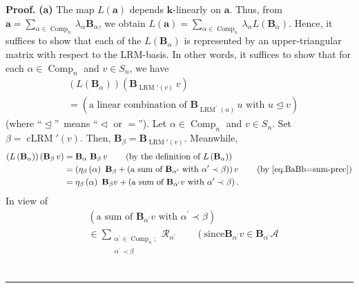 \documentclass[submission]{FPSAC2026}
\newcommand{\Comp}{\operatorname{Comp}}
\newcommand{\cLRM}{\operatorname{cLRM}}
\newcommand{\LRM}{\operatorname{LRM}}
\newenvironment{proof}[1][Proof]{\noindent\textbf{#1.} }{\ \rule{0.5em}{0.5em}}
\begin{document}
\begin{proof}
\textbf{(a)} The map $L\left(  \mathbf{a}\right)  $ depends $\mathbf{k}%
$-linearly on $\mathbf{a}$. Thus, from $\mathbf{a}=\sum_{\alpha\in
\operatorname{Comp}_{n}}\lambda_{\alpha}\mathbf{B}_{\alpha}$, we obtain
$L\left(  \mathbf{a}\right)  =\sum_{\alpha\in\operatorname{Comp}_{n}}%
\lambda_{\alpha}L\left(  \mathbf{B}_{\alpha}\right)  $. Hence, it suffices to
show that each of the $L\left(  \mathbf{B}_{\alpha}\right)  $ is represented
by an upper-triangular matrix with respect to the LRM-basis. In other words,
it suffices to show that for each $\alpha\in\Comp_{n}$
and $v\in S_{n}$, we have%
\begin{align}
& \left(  L\left(  \mathbf{B}_{\alpha}\right)  \right)  \left(  \mathbf{B}%
_{\LRM'(v)}\,v\right)  \nonumber\\
& =\left(  \text{a linear combination of }\mathbf{B}_{\operatorname{LRM}%
^{\prime}(u)}\,u\text{ with }u\trianglelefteq v\right)
\label{pf.cor.evals2.a.goal}%
\end{align}
(where \textquotedblleft$\trianglelefteq$\textquotedblright\ means
\textquotedblleft$\vartriangleleft$ or $=$\textquotedblright). Let $\alpha
\in\Comp_{n}$ and $v\in S_{n}$. Set $\beta
=\cLRM'\left(  v\right)  $. Then,
$\mathbf{B}_{\beta}=\mathbf{B}_{\LRM'(v)}$.
Meanwhile,
\begin{align}
\left(  L\left(  \mathbf{B}_{\alpha}\right)  \right)  \left(
\mathbf{B}_{\beta}\,v\right)
&  =\mathbf{B}_{\alpha}\ \mathbf{B}_{\beta}\,v\qquad\left(  \text{by the
definition of }L\left(  \mathbf{B}_{\alpha}\right)  \right)  \nonumber\\
&  =\left(  \eta_{\beta}\left(  \alpha\right)  \ \mathbf{B}_{\beta}+\left(
\text{a sum of }\mathbf{B}_{\alpha^{\prime}}\text{ with }\alpha^{\prime}%
\prec\beta\right)  \right)  v\qquad\left(  \text{by \eqref{eq.BaBb=sum-prec}}%
\right)  \nonumber\\
&  =\eta_{\beta}\left(  \alpha\right)  \ \mathbf{B}_{\beta}v+\left(  \text{a
sum of }\mathbf{B}_{\alpha^{\prime}}v\text{ with }\alpha^{\prime}\prec
\beta\right) .\nonumber
\end{align}
In view of%
\begin{align*}
&  \left(  \text{a sum of }\mathbf{B}_{\alpha^{\prime}}v\text{ with }%
\alpha^{\prime}\prec\beta\right)  \\
&  \in\sum_{\substack{\alpha^{\prime}\in\operatorname{Comp}_{n};\\\alpha
^{\prime}\prec\beta}}\mathcal{R}_{\alpha^{\prime}}\qquad\left(  \text{since
}\mathbf{B}_{\alpha^{\prime}}v\in\mathbf{B}_{\alpha^{\prime}}\mathcal{A}%

\end{align*}
\end{proof}
\end{document}
